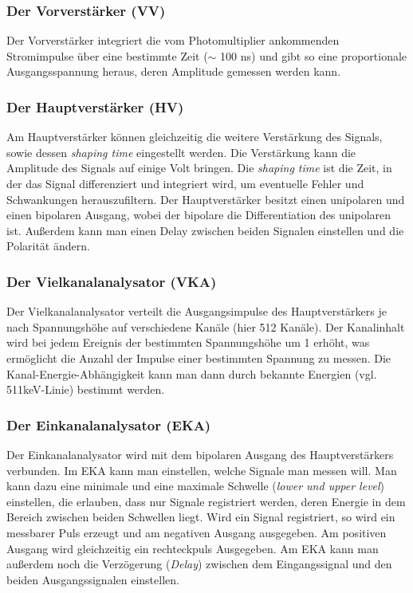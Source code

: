 \subsubsection{Der Vorverstärker (VV)}

Der Vorverstärker integriert die vom Photomultiplier ankommenden Stromimpulse über eine bestimmte Zeit ($\sim$ 100 ns) und gibt so eine proportionale Ausgangsspannung heraus, deren Amplitude gemessen werden kann.

\subsubsection{Der Hauptverstärker (HV)}

Am Hauptverstärker können gleichzeitig die weitere Verstärkung des Signals, sowie dessen \emph{shaping time} eingestellt werden. Die Verstärkung kann die Amplitude des Signals auf einige Volt bringen.  Die \emph{shaping time} ist die Zeit, in der das Signal differenziert und integriert wird, um eventuelle Fehler und Schwankungen herauszufiltern. Der Hauptverstärker besitzt einen unipolaren und einen bipolaren Ausgang, wobei der bipolare die Differentiation des unipolaren ist. Außerdem kann man einen Delay zwischen beiden Signalen einstellen und die Polarität ändern.

\subsubsection{Der Vielkanalanalysator (VKA)}

Der Vielkanalanalysator verteilt die Ausgangsimpulse des Hauptverstärkers je nach Spannungshöhe auf verschiedene Kanäle (hier 512 Kanäle). Der Kanalinhalt wird bei jedem Ereignis der bestimmten Spannungshöhe um 1 erhöht, was ermöglicht die Anzahl der Impulse einer bestimmten Spannung zu messen. Die Kanal-Energie-Abhängigkeit kann man dann durch bekannte Energien (vgl. 511keV-Linie) bestimmt werden.

\subsubsection{Der Einkanalanalysator (EKA)}

Der Einkanalanalysator wird mit dem bipolaren Ausgang des Hauptverstärkers verbunden. Im EKA kann man einstellen, welche Signale man messen will. Man kann dazu eine minimale und eine maximale Schwelle (\emph{lower und upper level}) einstellen, die erlauben, dass nur Signale registriert werden, deren Energie in dem Bereich zwischen beiden Schwellen liegt. Wird ein Signal registriert, so wird ein messbarer Puls erzeugt und am negativen Ausgang ausgegeben. Am positiven Ausgang wird gleichzeitig ein rechteckpuls Ausgegeben. Am EKA kann man außerdem noch die Verzögerung (\emph{Delay}) zwischen dem Eingangssignal und den beiden Ausgangssignalen einstellen. 

